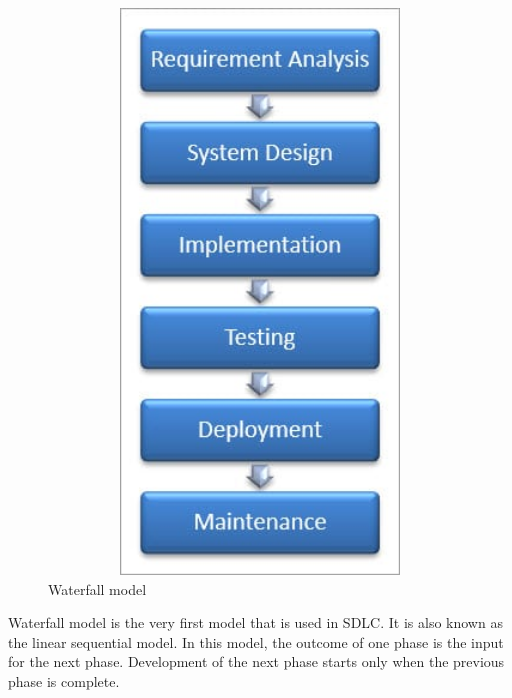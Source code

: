 \documentclass[oneside,a4paper,12pt]{book}
\begin{document}
\begin{figure}[h!]
  \centering
  \includegraphics[width=15cm, height=15cm]{water.jpg}
  \caption{Waterfall model}
\end{figure}
\par Waterfall model is the very first model that is used in SDLC. It is also known as the linear sequential model.
In this model, the outcome of one phase is the input for the next phase. Development of the next phase starts only when the previous phase is complete.
\end{document}
